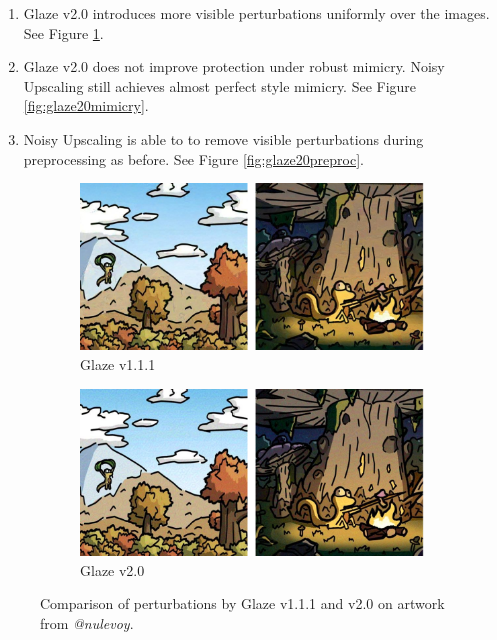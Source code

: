 \documentclass{article}
\begin{document}
\begin{enumerate}
    \item Glaze v2.0 introduces more visible perturbations uniformly over the images. See Figure \ref{fig:glaze20prot}.
    \item Glaze v2.0 does not improve protection under robust mimicry. Noisy Upscaling still achieves almost perfect style mimicry. See Figure \ref{fig:glaze20mimicry}.
    \item Noisy Upscaling is able to to remove visible perturbations during preprocessing as before. See Figure \ref{fig:glaze20preproc}.
\end{enumerate}

\begin{figure}[h]
    \centering
        \begin{subfigure}[b]{0.49\textwidth}
         \centering
         \includegraphics[width=\textwidth]{plots/Glaze11.pdf}
         \caption{Glaze v1.1.1}
     \end{subfigure}
     \hfill
     \begin{subfigure}[b]{0.49\textwidth}
         \centering
         \includegraphics[width=\textwidth]{plots/Glaze20.pdf}
         \caption{Glaze v2.0}
     \end{subfigure}
    \caption{Comparison of perturbations by Glaze v1.1.1 and v2.0 on artwork from \emph{@nulevoy}.}
    \label{fig:glaze20prot}
\end{figure}
\end{document}
